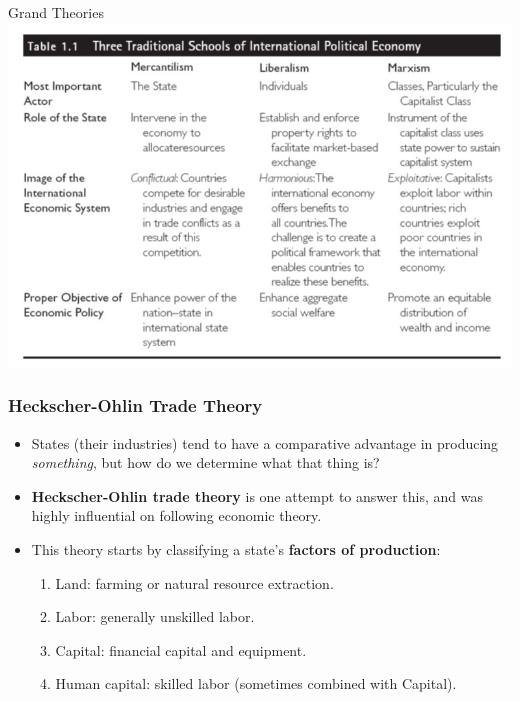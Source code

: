 \documentclass{beamer}
\begin{document}
\begin{frame}{\LARGE Grand Theories}
    \centering
\includegraphics[width=\textwidth,height=0.8\textheight,keepaspectratio]{grand theories.jpg}
\end{frame}

\begin{frame} 
	\frametitle{\LARGE{Heckscher-Ohlin Trade Theory}}
	\begin{itemize}
		\item States (their industries) tend to have a comparative advantage in producing \textit{something}, but how do we determine what that thing is? 
		\item \textbf{Heckscher-Ohlin trade theory} is one attempt to answer this, and was highly influential on following economic theory.
		\item This theory starts by classifying a state's \textbf{factors of production}: \pause
		\begin{enumerate}
			\item Land: farming or natural resource extraction. \pause
			\item Labor: generally unskilled labor. \pause
			\item Capital: financial capital and equipment. \pause
			\item Human capital: skilled labor (sometimes combined with Capital).
		\end{enumerate}
	\end{itemize}
\end{frame}
\end{document}
